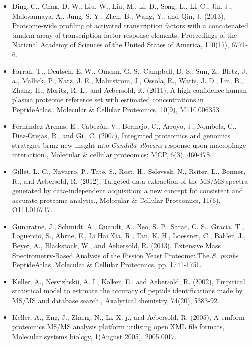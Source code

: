 \begin{itemize}[leftmargin=*]
\item[]{
Ding, C., Chan, D. W., Liu, W., Liu, M., Li, D., Song, L., Li, C., Jin, J., Malovannaya, A., Jung,
S. Y., Zhen, B., Wang, Y., and Qin, J. (2013), Proteome-wide profiling of activated 
transcription factors with a concatenated tandem array of transcription factor response elements,
Proceedings of the National Academy of Sciences of the United States of America, 110(17),
6771-6.
}

\item[]{
Farrah, T., Deutsch, E. W., Omenn, G. S., Campbell, D. S., Sun, Z., Bletz, J. a., Mallick, P., Katz,
J. E., Malmstrom, J., Ossola, R., Watts, J. D., Lin, B., Zhang, H., Moritz, R. L., 
and Aebersold, R. (2011), A high-confidence human plasma proteome reference set with estimated
concentrations in PeptideAtlas., Molecular \& Cellular Proteomics, 10(9), M110.006353.
}

\item[]{
Fern\'andez-Arenas, E., Cabez\'on, V., Bermejo, C., Arroyo, J., Nombela, C., Diez-Orejas, R.,
and Gil, C. (2007), Integrated proteomics and genomics strategies bring new insight into
\textit{Candida albicans} response upon macrophage interaction., 
Molecular \& cellular proteomics: MCP, 6(3), 460-478.
}

\item[]{
Gillet, L. C., Navarro, P., Tate, S., Rost, H., Selevsek, N., Reiter, L., Bonner, R., and Aebersold,
R. (2012), Targeted data extraction of the MS/MS spectra generated by data-independent
acquisition: a new concept for consistent and accurate proteome analysis., Molecular \&
Cellular Proteomics, 11(6), O111.016717.
}

\item[]{
Gunaratne, J., Schmidt, A., Quandt, A., Neo, S. P., Sarac, O. S., Gracia, T., Loguercio, S.,
Ahrne, E., Li Hai Xia, R., Tan, K. H., Loessner, C., Bahler, J., Beyer, A., Blackstock, W., and
Aebersold, R. (2013), Extensive Mass Spectrometry-Based Analysis of the Fission Yeast
Proteome: The \textit{S. pombe} PeptideAtlas, Molecular \& Cellular Proteomics, pp. 1741-1751.
}

\item[]{
Keller, A., Nesvizhskii, A. I., Kolker, E., and Aebersold, R. (2002), Empirical statistical model
to estimate the accuracy of peptide identifications made by MS/MS and database search.,
Analytical chemistry, 74(20), 5383-92.
}

\item[]{
Keller, A., Eng, J., Zhang, N., Li, X.-j., and Aebersold, R. (2005), A uniform proteomics MS/MS
analysis platform utilizing open XML file formats, Molecular systems biology, 1(August
2005), 2005.0017.
}


\end{itemize}
